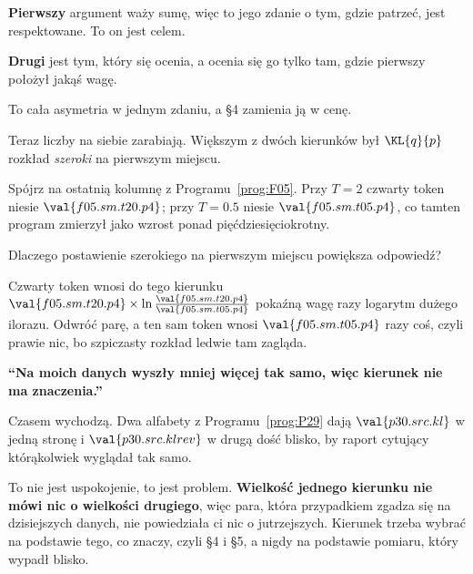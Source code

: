 \begin{fr}
\begin{ansblock}
\textbf{Pierwszy} argument waży sumę, więc to jego zdanie o tym, gdzie
patrzeć, jest respektowane. To on jest celem.

\textbf{Drugi} jest tym, który się ocenia, a ocenia się go tylko tam, gdzie
pierwszy położył jakąś wagę.
\end{ansblock}

To cała asymetria w jednym zdaniu, a §4 zamienia ją w cenę.
\end{fr}

\begin{fr}
Teraz liczby na siebie zarabiają. Większym z dwóch kierunków był
$\KL{q}{p}$ \dash{} rozkład \emph{szeroki} na pierwszym miejscu.

Spójrz na ostatnią kolumnę z Programu~\ref{prog:F05}. Przy $T = 2$ czwarty
token niesie $\val{f05.sm.t20.p4}$; przy $T = \num{0.5}$ niesie
$\val{f05.sm.t05.p4}$, co tamten program zmierzył jako wzrost ponad
pięćdziesięciokrotny.

Dlaczego postawienie szerokiego na pierwszym miejscu powiększa odpowiedź?
\dotline
\nextframe
\end{fr}

\begin{fr}

Czwarty token wnosi do tego kierunku $\val{f05.sm.t20.p4} \times \ln\frac{
\val{f05.sm.t20.p4}}{\val{f05.sm.t05.p4}}$ \dash{} pokaźną wagę razy
logarytm dużego ilorazu. Odwróć parę, a ten sam token wnosi
$\val{f05.sm.t05.p4}$ razy coś, czyli prawie nic, bo szpiczasty rozkład
ledwie tam zagląda.

\begin{trapbox}
\textbf{\enquote{Na moich danych wyszły mniej więcej tak samo, więc kierunek
nie ma znaczenia.}}

Czasem wychodzą. Dwa alfabety z Programu~\ref{prog:P29} dają
$\val{p30.src.kl}$ w jedną stronę i $\val{p30.src.klrev}$ w drugą \dash{}
dość blisko, by raport cytujący którąkolwiek wyglądał tak samo.

To nie jest uspokojenie, to jest problem. \textbf{Wielkość jednego kierunku
nie mówi nic o wielkości drugiego}, więc para, która przypadkiem zgadza się
na dzisiejszych danych, nie powiedziała ci nic o jutrzejszych. Kierunek
trzeba wybrać na podstawie tego, co znaczy, czyli §4 i §5, a nigdy na
podstawie pomiaru, który wypadł blisko.
\end{trapbox}
\end{fr}

